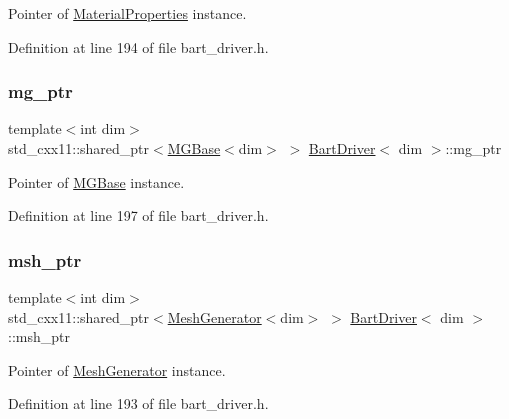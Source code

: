 Pointer of \hyperlink{class_material_properties}{Material\+Properties} instance. 



Definition at line 194 of file bart\+\_\+driver.\+h.

\mbox{\label{class_bart_driver_a1ae1a91d9a049ba4354c71f6ad689d74}} 
\subsubsection{\texorpdfstring{mg\+\_\+ptr}{mg\_ptr}}
{\footnotesize\ttfamily template$<$int dim$>$ \\
std\+\_\+cxx11\+::shared\+\_\+ptr$<$\hyperlink{class_m_g_base}{M\+G\+Base}$<$dim$>$ $>$ \hyperlink{class_bart_driver}{Bart\+Driver}$<$ dim $>$\+::mg\+\_\+ptr\hspace{0.3cm}{\ttfamily [private]}}



Pointer of \hyperlink{class_m_g_base}{M\+G\+Base} instance. 



Definition at line 197 of file bart\+\_\+driver.\+h.

\mbox{\label{class_bart_driver_a976c3ba1c98180dced85019dfd56e225}} 
\subsubsection{\texorpdfstring{msh\+\_\+ptr}{msh\_ptr}}
{\footnotesize\ttfamily template$<$int dim$>$ \\
std\+\_\+cxx11\+::shared\+\_\+ptr$<$\hyperlink{class_mesh_generator}{Mesh\+Generator}$<$dim$>$ $>$ \hyperlink{class_bart_driver}{Bart\+Driver}$<$ dim $>$\+::msh\+\_\+ptr\hspace{0.3cm}{\ttfamily [private]}}



Pointer of \hyperlink{class_mesh_generator}{Mesh\+Generator} instance. 



Definition at line 193 of file bart\+\_\+driver.\+h.

\mbox{\label{class_bart_driver_a3726013dac04d13b87e35cb0c3b8b557}} 
